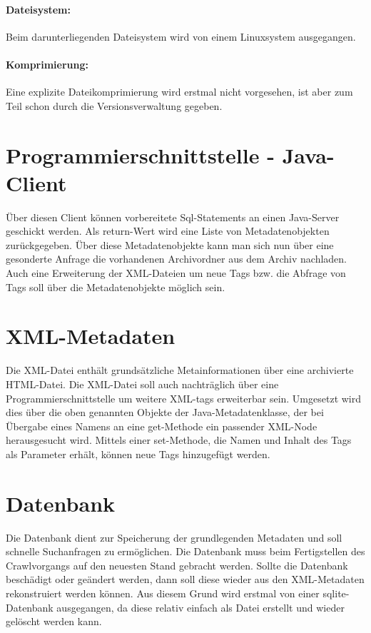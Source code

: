 \paragraph{Dateisystem:} Beim darunterliegenden Dateisystem wird von einem Linuxsystem ausgegangen.
\paragraph{Komprimierung:} Eine explizite Dateikomprimierung wird erstmal nicht vorgesehen, ist aber 
	zum Teil schon durch die Versionsverwaltung gegeben.

\section{Programmierschnittstelle - Java-Client}
Über diesen Client können vorbereitete Sql-Statements an einen Java-Server geschickt werden. Als return-Wert
wird eine Liste von Metadatenobjekten zurückgegeben.
Über diese Metadatenobjekte kann man sich nun über eine gesonderte Anfrage die vorhandenen Archivordner aus dem Archiv nachladen.
Auch eine Erweiterung der XML-Dateien um neue Tags bzw. die Abfrage von Tags soll über die 
Metadatenobjekte möglich sein.

\section{XML-Metadaten}
Die XML-Datei enthält grundsätzliche Metainformationen über eine archivierte HTML-Datei.
Die XML-Datei soll auch nachträglich über eine Programmierschnittstelle um weitere XML-tags erweiterbar sein.
Umgesetzt wird dies über die oben genannten Objekte der Java-Metadatenklasse, 
der bei Übergabe eines Namens an eine get-Methode ein passender XML-Node herausgesucht wird.
Mittels einer set-Methode, die Namen und Inhalt des Tags als Parameter erhält, können neue Tags hinzugefügt werden. 

\section{Datenbank}
Die Datenbank dient zur Speicherung der grundlegenden Metadaten und soll schnelle Suchanfragen zu ermöglichen.
Die Datenbank muss beim Fertigstellen des Crawlvorgangs auf den neuesten Stand gebracht werden.
Sollte die Datenbank beschädigt oder geändert werden, dann soll diese wieder aus den
XML-Metadaten rekonstruiert werden können.
Aus diesem Grund wird erstmal von einer sqlite-Datenbank ausgegangen, 
da diese relativ einfach als Datei erstellt und wieder gelöscht werden kann. 

